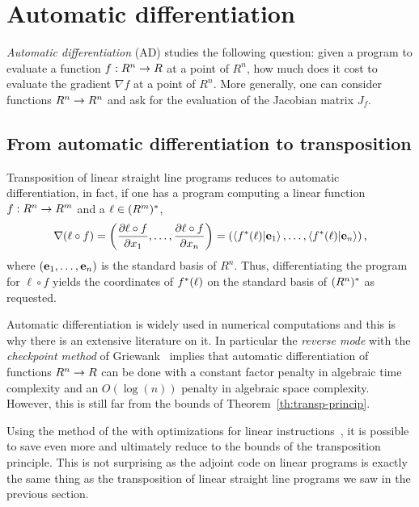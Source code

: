 \section{Automatic differentiation}
\label{sec:autom-diff}

\emph{Automatic differentiation}
(AD) studies the following
question: given a program to evaluate a function $f:R^n\rightarrow R$ at a
point of $R^n$, how much does it cost to evaluate the gradient $\nabla
f$ at a point of $R^n$. More generally, one can consider functions
$R^n\rightarrow R^n$ and ask for the evaluation of the Jacobian matrix $J_f$.

\subsection{From automatic differentiation to transposition}
\label{sec:from-autom-diff}
Transposition of linear straight line programs reduces to automatic
differentiation, in fact, if one has a program computing a linear
function $f:R^n\rightarrow R^m$ and a $\ell\in(R^m)^\ast$,
\begin{equation}
  \label{eq:261}
  \nabla (\ell\circ f) =
  \left(\frac{\partial \ell\circ f}{\partial x_1},\ldots,\frac{\partial \ell\circ f}{\partial x_n}\right) =
  \left(\left\langle f^\ast(\ell) \middle| \mathbf{e}_1 \right\rangle,\ldots,\left\langle f^\ast(\ell) \middle| \mathbf{e}_n \right\rangle\right)
  \text{,}
\end{equation}
where $(\mathbf{e}_1,\ldots,\mathbf{e}_n)$ is the standard basis of
$R^n$. Thus, differentiating the program for $\ell\circ f$ yields the
coordinates of $f^\ast(\ell)$ on the standard basis of
$(R^n)^\ast$ as requested.

Automatic differentiation is widely used in numerical computations and
this is why there is an extensive literature on it. In particular the
\emph{reverse
  mode} with the
\emph{checkpoint
  method} of Griewank~\cite{griewank92} implies that automatic
differentiation of functions $R^n\rightarrow R$ can be done with a constant
factor penalty in algebraic time complexity and an $O(\log(n))$
penalty in algebraic space complexity. However, this is still far from
the bounds of Theorem~\ref{th:transp-princip}.

Using the method of the
 with optimizations for linear
instructions~\cite{gilbert+levey+masse91}, it is possible to save even
more and ultimately reduce to the bounds of the transposition
principle. This is not surprising as the adjoint code on linear
programs is exactly the same thing as the transposition of linear
straight line programs we saw in the previous section.

